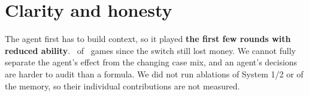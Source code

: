 \documentclass[10pt]{article}
\begin{document}
\section{Clarity and honesty}
The agent first has to build context, so it played \textbf{the first few rounds with reduced ability}.
\PostLosses\ of \PostGames\ games since the switch still lost money. We cannot fully separate the agent's effect from
the changing case mix, and an agent's decisions are harder to audit than a formula. We did not run ablations of System 1/2 or of the memory,
so their individual contributions are not measured.
\end{document}

